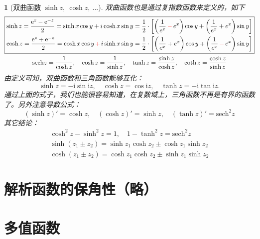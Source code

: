 \documentclass[UTF8]{report}
\theoremstyle{MyLineTheoremStyle} %
\theoremstyle{MyBlockTheoremStyle} %
\theoremstyle{MySubsubsectionStyle} %
\newtheorem{definition}{}
\begin{document}
\begin{definition}[双曲函数 $\sinh z,\ \cosh z,\ ...$]
双曲函数也是通过复指数函数来定义的，如下
\begin{gather}
    \boxed{
    \begin{aligned}
        \sinh z
        = \frac{\mathrm{e}^{z}-\mathrm{e}^{-z}}{2} 
        = \sinh x \cos y + i \cosh x \sin y
        = \frac{1}{2}\cdot \left[ \left( \frac{1}{e^x} {\color{red} \,-\,} e^x \right)\cos y + \left( \frac{1}{e^x} + e^x \right)\sin y \right]
        \\
        \cosh z
        = \frac{\mathrm{e}^{z}+\mathrm{e}^{-z}}{2} 
        = \cosh x \cos y {\color{red} \,+\,} i \sinh x \sin y
        = \frac{1}{2}\cdot \left[ \left( \frac{1}{e^x} + e^x \right)\cos y + \left( \frac{1}{e^x} {\color{red} \,-\,} e^x \right)\sin y \right]
    \end{aligned}
    }
    \\
    \mathrm{sech}z=\frac{1}{\cosh z},\quad\cosh z=\frac{1}{\sinh z},\quad 
    \tanh z=\frac{\sinh z}{\cosh z},\quad \coth z=\frac{\cosh z}{\sinh z}
\end{gather}
由定义可知，双曲函数和三角函数能够互化：
\begin{equation}
    \sinh z=-\mathrm{i}\sin\mathrm{i}z,\quad\cosh z=\cos\mathrm{i}z,\quad\tanh z=-\mathrm{i}\tan\mathrm{i}z.
\end{equation}
通过上面的式子，我们也能很容易知道，在复数域上，三角函数不再是有界的函数了。另外注意导数公式：
\begin{equation}
    (\sinh z)'=\cosh z,\quad(\cosh z)'=\sinh z,\quad(\tanh z)'=\mathrm{sech}^2z
\end{equation}
其它结论：
\begin{gather}
    \cosh^{2}z-\sinh^{2}z=1, \quad1-\tanh^{2}z=\mathrm{sech}^{2}z \\ 
    \sinh\left(z_{1}\pm z_{2}\right)=\sinh z_{1}\cosh z_{2}\pm\cosh z_{1}\sinh z_{2}\\
    \cosh\left(z_{1}\pm z_{2}\right)=\cosh z_{1}\cosh z_{2}\pm\sinh z_{1}\sinh z_{2}
\end{gather}
\end{definition}

\section{解析函数的保角性（略）}
\section{多值函数}
\end{document}
